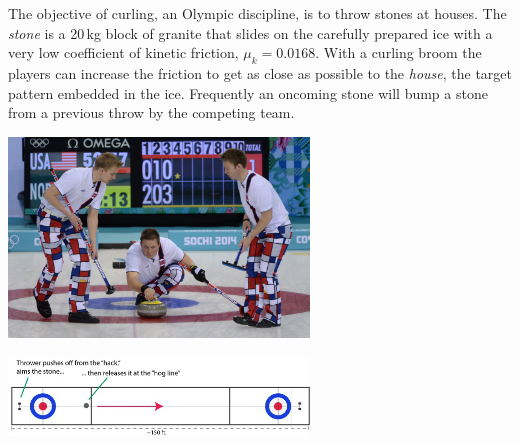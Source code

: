 \documentclass[letterpaper,addpoints,answers]{exam}
\begin{document}
\begin{questions}


\pagebreak

\question
The objective of curling, an Olympic discipline, is to throw stones at houses. The \emph{stone} is a 20\,kg block of granite that slides on the carefully prepared ice with a very low coefficient of kinetic friction, $\mu_k = 0.0168$. With a curling broom the players can increase the friction to get as close as possible to the \emph{house}, the target pattern embedded in the ice. Frequently an oncoming stone will bump a stone from a previous throw by the competing team.

\begin{center}
 \includegraphics[width=0.6\textwidth]{test2/curling-photo}
\end{center}
\begin{center}
 \includegraphics[width=0.6\textwidth]{test2/curling-sheet}
\end{center}


\end{questions}
\end{document}
